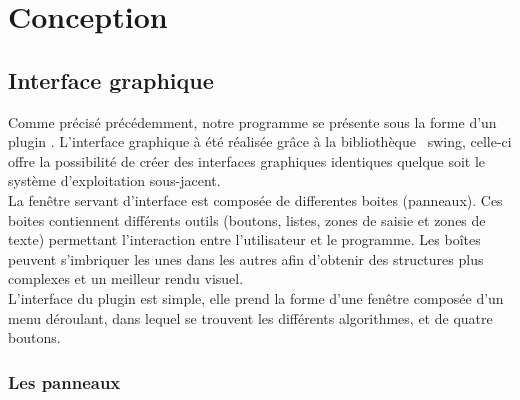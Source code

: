 \chapter{Conception}

\section{Interface graphique}

Comme précisé précédemment, notre programme se présente sous la forme d'un plugin \imj . L'interface graphique à été réalisée grâce à la bibliothèque  \java ~swing, %
celle-ci offre la possibilité de créer des interfaces graphiques identiques quelque soit le système d'exploitation sous-jacent.\\
La fenêtre servant d'interface est composée de differentes boites (panneaux). Ces boites contiennent différents outils (boutons, listes, zones de saisie et zones de texte) permettant l'interaction entre l'utilisateur et le programme. Les boîtes peuvent s'imbriquer les unes dans les autres afin d'obtenir des structures plus complexes et un meilleur rendu visuel. \\
L'interface du plugin est simple, elle prend la forme d'une fenêtre composée d'un menu déroulant, dans lequel se trouvent les différents algorithmes, et de quatre boutons. \\

\subsection{Les panneaux}

